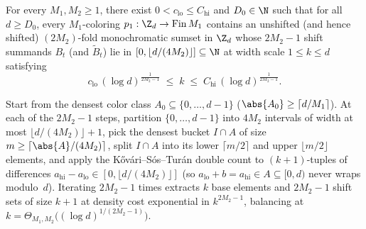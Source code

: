 \begin{lemma}\label{lem:kst-sumset}
For every $M_1, M_2 \ge 1$, there exist $0 < c_{\mathrm{lo}} \le C_{\mathrm{hi}}$ and $D_0 \in \N$
such that for all $d \ge D_0$, every $M_1$-coloring $p_1 : \Z_d \to \mathrm{Fin}\,M_1$ contains an
unshifted (and hence shifted) $(2M_2)$-fold monochromatic sumset in $\Z_d$ whose $2M_2 - 1$ shift
summands $B_t$ (and $\widetilde{B}_t$) lie in $[0, \lfloor d/(4M_2)\rfloor] \subseteq \N$ at width
scale $1 \le k \le d$ satisfying
\[
  c_{\mathrm{lo}}\,(\log d)^{\frac{1}{2M_2 - 1}} \;\le\; k \;\le\;
  C_{\mathrm{hi}}\,(\log d)^{\frac{1}{2M_2 - 1}}.
\]
\end{lemma}
\begin{outline}
Start from the densest color class $A_0 \subseteq \{0,\dots,d-1\}$ ($\abs{A_0} \ge \lceil d/M_1\rceil$).
At each of the $2M_2 - 1$ steps, partition $\{0,\dots,d-1\}$ into $4M_2$ intervals of width at most
$\lfloor d/(4M_2)\rfloor + 1$, pick the densest bucket $I \cap A$ of size
$m \ge \lceil\abs{A}/(4M_2)\rceil$, split $I \cap A$ into its lower $\lceil m/2\rceil$ and upper
$\lfloor m/2\rfloor$ elements, and apply the K\H{o}v\'ari--S\'os--Tur\'an double count
\cite{KovariSosTuran1954} to $(k+1)$-tuples of differences
$a_{\mathrm{hi}} - a_{\mathrm{lo}} \in [0, \lfloor d/(4M_2)\rfloor]$ (so $a_{\mathrm{lo}} + b =
a_{\mathrm{hi}} \in A \subseteq [0, d)$ never wraps modulo~$d$). Iterating $2M_2 - 1$ times extracts
$k$ base elements and $2M_2 - 1$ shift sets of size $k + 1$ at density cost exponential in
$k^{2M_2 - 1}$, balancing at $k = \Theta_{M_1,M_2}\bigl((\log d)^{1/(2M_2-1)}\bigr)$.
\end{outline}

